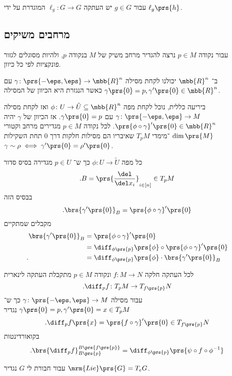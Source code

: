\documentclass[10pt, twoside]{book}
\newcommand{\Lie}{\mrm{Lie}}
\begin{document}
\begin{definition}
עבור
$g \in G$
יש העתקה
$\ell_g \colon G \to G$
המוגדרת על ידי
$\ell_g\prs{h}$.
\end{definition}

\subsection{מרחבים משיקים}

עבור נקודה
$p \in M$
נרצה להגדיר מרחב משיק של
$M$
בנקודה
$p$,
ולהיות מסוגלים לגזור פונקציות לפי כל כיוון.

ב־%
$\mbb{R}^n$
יכולנו לקחת מסילה
$\gamma \colon \prs{-\eps,\eps} \to \mbb{R}^n$
עם
$\gamma\prs{0} = p, \gamma'\prs{0} \in \mbb{R}^n$
כאשר הנגזרת היא הכיוון של המסילה.

ביריעה כללית, נוכל לקחת מפה
$\phi \colon U \to \tilde{U} \subseteq \mbb{R}^n$
ואז לקחת מסילה
$\gamma \colon \prs{-\eps,\eps} \to M$
עם
$\gamma\prs{0} = p$.
אז הכיוון של
$\gamma$
יהיה
$\prs{\phi \circ \gamma}'\prs{0} \in \mbb{R}^n$.
לכל נקודה
$p \in M$
מגדירים מרחב וקטורי
$\dim\prs{M}$%
־מימדי
$T_p M$
שאיבריו הם מסילות חלקות דרך
$0$
תחת השקילות
$\gamma \sim \rho \iff \gamma'\prs{0} = \rho'\prs{0}$.

כל מפה
$\phi \colon U \to \tilde{U}$
כך ש־%
$p \in U$
מגדירה בסיס סדור
\[\text{.} B = \prs{\frac{\del}{\del x_i}}_{i \in [n]} \in T_p M\]
בבסיס הזה
\[\text{.}\brs{\gamma'\prs{0}}_{B} = \prs{\phi \circ \gamma}'\prs{0}\]
מקבלים שמתקיים
\begin{align*}
\brs{\gamma'\prs{0}}_B &= \prs{\phi \circ \gamma}' \prs{0}
\\&= \diff_{\phi\prs{p}}\prs{\phi} \circ \prs{\phi \circ \gamma}'\prs{0}
\\\text{.} \hphantom{\brs{\gamma'\prs{0}}_B} &= \diff_{\phi\prs{p}} \prs{\phi} \cdot \brs{\gamma'\prs{0}}_B
\end{align*}

לכל העתקה חלקה
$f \colon M \to N$
ונקודה
$p \in M$
מתקבלת העתקה לינארית
\[\text{.}\diff_p f \colon T_p M \to T_{f\prs{p}} N\]
עבור מסילה
$\gamma \colon \prs{-\eps,\eps} \to M$
כך ש־%
$\gamma\prs{0} = p, \gamma'\prs{0} = x \in T_p M$
נגדיר
\[\text{.} \diff_p f \prs{x} = \prs{f \circ \gamma}'\prs{0} \in T_{f\prs{p}} N\]
בקואורדינטות
\[\text{.} \brs{\diff_p f}_{B\prs{p}}^{B\prs{f\prs{p}}} = \diff_{\phi\prs{p}} \prs{\psi \circ f \circ \phi^{-1}}\]

\begin{definition}
עבור חבורת לי
$G$
נגדיר
$\Lie\prs{G} = T_e G$.
\end{definition}
\end{document}
